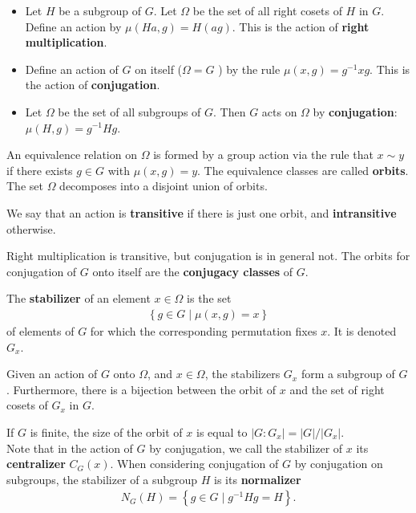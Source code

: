 \documentclass{memoir}
\begin{document}
\begin{exmp}
	\begin{itemize}
		\item Let \(H\) be a subgroup of \(G\). Let \(\Omega\) be the set of all right cosets of \(H\) in \(G\). Define an action by \(\mu(Ha,g) = H(ag)\). This is the action of \textbf{right multiplication}.
		\item Define an action of \(G\) on itself (\(\Omega = G\) ) by the rule \(\mu(x,g) = g^{-1}xg\). This is the action of \textbf{conjugation}.
		\item Let \(\Omega\) be the set of all subgroups of \(G\). Then \(G\) acts on \(\Omega\) by \textbf{conjugation}: \(\mu(H,g) = g^{-1}Hg\).
	\end{itemize}
\end{exmp}
An equivalence relation on \(\Omega\) is formed by a group action via the rule that \(x \sim y\) if there exists \(g \in G\) with \(\mu(x,g) = y\). The equivalence classes are called \textbf{orbits}. The set \(\Omega\) decomposes into a disjoint union of orbits.
\begin{defn}[Transitivity]
	We say that an action is \textbf{transitive} if there is just one orbit, and \textbf{intransitive} otherwise.
\end{defn}
Right multiplication is transitive, but conjugation is in general not. The orbits for conjugation of \(G\) onto itself are the \textbf{conjugacy classes} of \(G\).
\begin{defn}[Stabilizer]
	The \textbf{stabilizer} of an element \(x \in \Omega\) is the set
	\begin{align*}
		\left\{g \in G \mid \mu(x,g) = x \right\} 
	\end{align*}
	of elements of \(G\) for which the corresponding permutation fixes \(x\). It is denoted \(G_x\).
\end{defn}

\begin{thm}
	Given an action of \(G\) onto \(\Omega\), and \(x \in \Omega\), the stabilizers \(G_x\) form a subgroup of \(G\). Furthermore, there is a bijection between the orbit of \(x\) and the set of right cosets of \(G_x\) in \(G\).
\end{thm}
If \(G\) is finite, the size of the orbit of \(x\) is equal to \( \left| G:G_x \right| = \left| G \right| / \left| G_x \right| \).\\

Note that in the action of \(G\) by conjugation, we call the stabilizer of \(x\) its \textbf{centralizer} \(C_G(x)\). When considering conjugation of \(G\) by conjugation on subgroups, the stabilizer of a subgroup \(H\) is its \textbf{normalizer}
\begin{align*}
	N_G(H) = \left\{g \in G \mid g^{-1} H g = H \right\} .
\end{align*}
\end{document}
